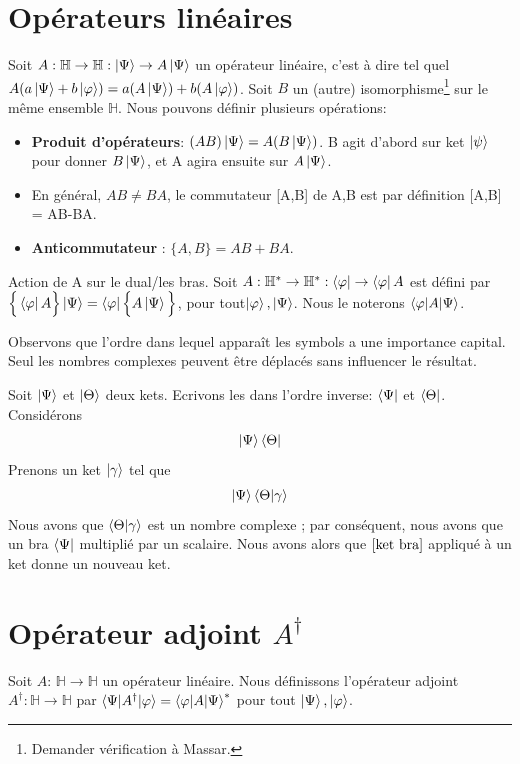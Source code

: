 \documentclass[../notesdecours.tex]{subfiles}
\begin{document}
\section{Opérateurs linéaires}
Soit $A : \mathbb{H} \rightarrow \mathbb{H} : \ket{\Psi} \rightarrow A\ket{\Psi}$ un opérateur linéaire, c'est à dire tel quel $A(a\ket{\Psi}+b\ket{\varphi}) = a(A\ket{\Psi})+b(A\ket{\varphi})$. Soit $B$ un (autre) isomorphisme\footnote{Demander vérification à Massar.} sur le même ensemble $\mathbb{H}$. Nous pouvons définir plusieurs opérations:
\begin{itemize}
\item \textbf{Produit d'opérateurs}: $(AB)\ket{\Psi} = A(B\ket{\Psi})$. B agit d'abord sur ket $\ket{\psi}$ pour donner $B\ket{\Psi}$, et A agira ensuite sur $A\ket{\Psi}$.
\item En général, $AB\neq BA$, le commutateur [A,B] de A,B est par définition [A,B] = AB-BA.
\item \textbf{Anticommutateur} : $\bigg\{A,B\bigg\} = AB+BA$.
\end{itemize}
Action de A sur le dual/les bras. Soit $A: \mathbb{H}^* \rightarrow \mathbb{H}^* : \bra{\varphi} \rightarrow \bra{\varphi}A$ est défini par $\Big\{\bra{\varphi}A\Big\}\ket{\Psi} = \bra{\varphi}\Big\{A\ket{\Psi}\Big\}$, pour tout$\ket{\varphi},\ket{\Psi}$. Nous le noterons $\braket{\varphi|A|\Psi}$.
\begin{remark} Observons que l'ordre dans lequel apparaît les symbols a une importance capital. Seul les nombres complexes peuvent être déplacés sans influencer le résultat. \end{remark}

\begin{exemple} 
Soit $\ket{\Psi}$ et $\ket{\Theta}$ deux kets. Ecrivons les dans l'ordre inverse: $\bra{\Psi}$ et $\bra{\Theta}$. Considérons 
\begin{equation}
\ket{\Psi}\bra{\Theta}
\label{ket bra}
\end{equation}
Prenons un ket $\ket{\gamma}$ tel que
\begin{equation}
\ket{\Psi}\braket{\Theta|\gamma}
\end{equation}
Nous avons que $\braket{\Theta|\gamma}$ est un nombre complexe ; par conséquent, nous avons que un bra $\bra{\Psi}$ multiplié par un scalaire. Nous avons alors que $\eqref{ket bra}$ appliqué à un ket donne un nouveau ket.
\end{exemple}

\section{Opérateur adjoint $A^\dag$}
\begin{definition} Soit $A$: $\mathbb{H} \rightarrow \mathbb{H}$ un opérateur linéaire. Nous définissons l'opérateur adjoint $A^\dag : \mathbb{H} \rightarrow \mathbb{H}$ par $\braket{\Psi|A^\dag|\varphi} = \braket{\varphi|A|\Psi}^*$ pour tout $\ket{\Psi},\ket{\varphi}$. \end{definition}
\end{document}
